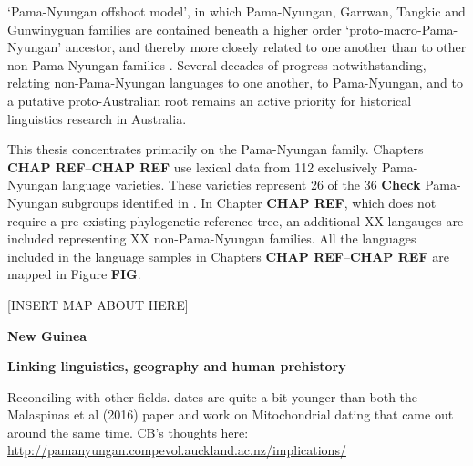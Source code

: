 `Pama-Nyungan offshoot model', in which Pama-Nyungan, Garrwan, Tangkic and Gunwinyguan families are contained beneath a higher order `proto-macro-Pama-Nyungan' ancestor, and thereby more closely related to one another than to other non-Pama-Nyungan families \autocites{ogrady_preliminaries_1979}{evans_cradle_1997}{nicholas_enigma_1998}. Several decades of progress notwithstanding, relating non-Pama-Nyungan languages to one another, to Pama-Nyungan, and to a putative proto-Australian root remains an active priority for historical linguistics research in Australia.

This thesis concentrates primarily on the Pama-Nyungan family. Chapters \textbf{CHAP REF}--\textbf{CHAP REF} use lexical data from 112 exclusively Pama-Nyungan language varieties. These varieties represent 26 of the 36 \textbf{Check} Pama-Nyungan subgroups identified in \textcite{bowern_pama-nyungan_2018}. In Chapter \textbf{CHAP REF}, which does not require a pre-existing phylogenetic reference tree, an additional XX langauges are included representing XX non-Pama-Nyungan families. All the languages included in the language samples in Chapters \textbf{CHAP REF}--\textbf{CHAP REF} are mapped in Figure \textbf{FIG}.

{[}INSERT MAP ABOUT HERE{]}

\textbf{New Guinea}

\textbf{Linking linguistics, geography and human prehistory}

Reconciling with other fields. \textcite{bouckaert_origin_2018} dates are quite a bit younger than both the Malaspinas et al (2016) paper and work on Mitochondrial dating that came out around the same time. CB's thoughts here: \url{http://pamanyungan.compevol.auckland.ac.nz/implications/}

